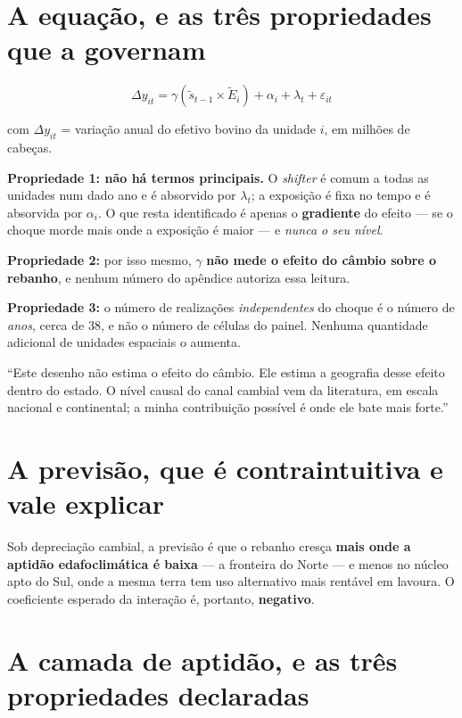 \section{A equação, e as três propriedades que a governam}

\begin{equation}
\Delta y_{it} = \gamma \left( \tilde{s}_{t-1} \times \tilde{E}_i \right)
              + \alpha_i + \lambda_t + \varepsilon_{it}
\label{eq:shiftshare}
\end{equation}

com $\Delta y_{it}$ = variação anual do efetivo bovino da unidade $i$, em
milhões de cabeças.

\vspace{6pt}
\textbf{Propriedade 1: não há termos principais.} O \emph{shifter} é comum a
todas as unidades num dado ano e é absorvido por $\lambda_t$; a exposição é fixa
no tempo e é absorvida por $\alpha_i$. O que resta identificado é apenas o
\textbf{gradiente} do efeito --- se o choque morde mais onde a exposição é maior
--- e \emph{nunca o seu nível}.

\textbf{Propriedade 2:} por isso mesmo, $\gamma$ \textbf{não mede o efeito do
câmbio sobre o rebanho}, e nenhum número do apêndice autoriza essa leitura.

\textbf{Propriedade 3:} o número de realizações \emph{independentes} do choque é
o número de \emph{anos}, cerca de 38, e não o número de células do painel.
Nenhuma quantidade adicional de unidades espaciais o aumenta.

\begin{nabanca}
``Este desenho não estima o efeito do câmbio. Ele estima a geografia desse
efeito dentro do estado. O nível causal do canal cambial vem da literatura, em
escala nacional e continental; a minha contribuição possível é onde ele bate
mais forte.''
\end{nabanca}

\section{A previsão, que é contraintuitiva e vale explicar}

Sob depreciação cambial, a previsão é que o rebanho cresça \textbf{mais onde a
aptidão edafoclimática é baixa} --- a fronteira do Norte --- e menos no núcleo
apto do Sul, onde a mesma terra tem uso alternativo mais rentável em lavoura. O
coeficiente esperado da interação é, portanto, \textbf{negativo}.

\section{A camada de aptidão, e as três propriedades declaradas}

